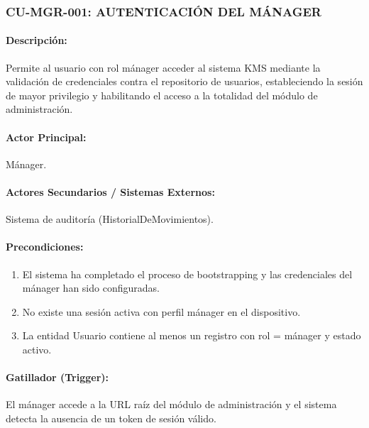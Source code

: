 \subsubsection{CU-MGR-001: AUTENTICACIÓN DEL MÁNAGER}
\paragraph{Descripción:} Permite al usuario con rol mánager acceder al sistema KMS mediante la validación de credenciales contra el repositorio de usuarios, estableciendo la sesión de mayor privilegio y habilitando el acceso a la totalidad del módulo de administración.

\paragraph{Actor Principal:} Mánager.

\paragraph{Actores Secundarios / Sistemas Externos:} Sistema de auditoría (HistorialDeMovimientos).

\paragraph{Precondiciones:}
\begin{enumerate}
    \item[I.] El sistema ha completado el proceso de bootstrapping y las credenciales del mánager han sido configuradas.
    \item[II.] No existe una sesión activa con perfil mánager en el dispositivo.
    \item[III.] La entidad Usuario contiene al menos un registro con rol = mánager y estado activo.
\end{enumerate}

\paragraph{Gatillador (Trigger):} El mánager accede a la URL raíz del módulo de administración y el sistema detecta la ausencia de un token de sesión válido.

